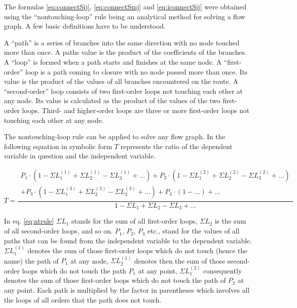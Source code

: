 \addvspace{12pt}

The formulas \eqref{eq:connectSij}, \eqref{eq:connectSmj} and
\eqref{eq:iconnectSij} were obtained using the ``nontouching-loop''
rule being an analytical method for solving a flow graph.  A few basic
definitions have to be understood.

\addvspace{12pt}

A ``path'' is a series of branches into the same direction with no
node touched more than once.  A paths value is the product of the
coefficients of the branches.  A ``loop'' is formed when a path starts
and finishes at the same node.  A ``first-order'' loop is a path
coming to closure with no node passed more than once.  Its value is
the product of the values of all branches encountered on the route.  A
``second-order'' loop consists of two first-order loops not touching
each other at any node.  Its value is calculated as the product of the
values of the two first-order loops.  Third- and higher-order loops
are three or more first-order loops not touching each other at any
node.

\addvspace{12pt}

The nontouching-loop rule can be applied to solve any flow graph.  In
the following equation in symbolic form $T$ represents the ratio of
the dependent variable in question and the independent variable.

\begin{equation}
T = \dfrac{
\begin{array}{r}
P_{1}\cdot\left(1 - \Sigma L_{1}^{(1)} + \Sigma L_{2}^{(1)} - \Sigma L_{3}^{(1)} + \ldots\right) +
P_{2}\cdot\left(1 - \Sigma L_{1}^{(2)} + \Sigma L_{2}^{(2)} - \Sigma L_{3}^{(2)} + \ldots\right)\\
+ P_{3}\cdot\left(1 - \Sigma L_{1}^{(3)} + \Sigma L_{2}^{(3)} - \Sigma L_{3}^{(3)} + \ldots\right) +
P_{4}\cdot\left(1 - \ldots\right) + \ldots
\end{array}
}{1 - \Sigma L_{1} + \Sigma L_{2} - \Sigma L_{3} + \ldots}
\label{eq:ntrule}
\end{equation}

In eq. \eqref{eq:ntrule} $\Sigma L_{1}$ stands for the sum of all
first-order loops, $\Sigma L_{2}$ is the sum of all second-order
loops, and so on.  $P_{1}$, $P_{2}$, $P_{3}$ etc., stand for the
values of all paths that can be found from the independent variable to
the dependent variable.  $\Sigma L_{1}^{(1)}$ denotes the sum of those
first-order loops which do not touch (hence the name) the path of
$P_{1}$ at any node, $\Sigma L_{2}^{(1)}$ denotes then the sum of
those second-order loops which do not touch the path $P_{1}$ at any
point, $\Sigma L_{1}^{(2)}$ consequently denotes the sum of those
first-order loops which do not touch the path of $P_{2}$ at any point.
Each path is multiplied by the factor in parentheses which involves
all the loops of all orders that the path does not touch.

